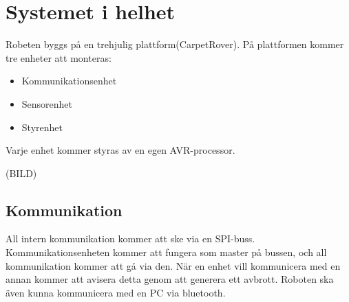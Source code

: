 \section{Systemet i helhet}
Robeten byggs på en trehjulig plattform(CarpetRover). På plattformen kommer tre enheter att monteras:
\begin{itemize}
        \item Kommunikationsenhet
        \item Sensorenhet
        \item Styrenhet
\end{itemize}
Varje enhet kommer styras av en egen AVR-processor.

(BILD)


\subsection{Kommunikation}
All intern kommunikation kommer att ske via en SPI-buss. Kommunikationsenheten kommer att fungera som master på bussen, och all kommunikation kommer att gå via den. När en enhet vill kommunicera med en annan kommer att avisera detta genom att generera ett avbrott. 
Roboten ska även kunna kommunicera med en PC via bluetooth.


